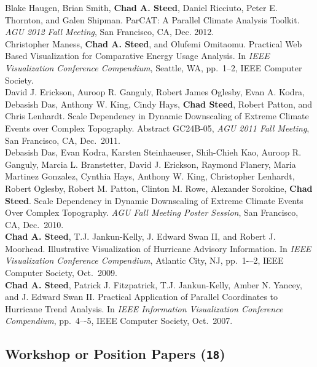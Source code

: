 \documentclass[11pt, a4paper]{article}
\newcommand{\years}[1]{\marginnote{\scriptsize #1}}
\begin{document}
\noindent\years{2012}Blake Haugen, Brian Smith, \textbf{Chad A. Steed},
Daniel Ricciuto, Peter E. Thornton, and Galen Shipman.  ParCAT: A Parallel
Climate Analysis Toolkit. \emph{AGU 2012 Fall Meeting}, San Francisco, CA, Dec. 2012.\\
\years{2012}Christopher Maness, \textbf{Chad A. Steed}, and
Olufemi Omitaomu. Practical Web Based Visualization for Comparative Energy
Usage Analysis.  In \emph{IEEE Visualization Conference Compendium}, Seattle, WA,
pp.\ 1--2, IEEE Computer Society.\\
\years{2011}David J. Erickson, Auroop R. Ganguly, Robert
James Oglesby, Evan A. Kodra, Debasish Das, Anthony W. King, Cindy Hays,
\textbf{Chad Steed}, Robert Patton, and Chris Lenhardt. Scale Dependency in
Dynamic Downscaling of Extreme Climate Events over Complex Topography.
Abstract GC24B-05, \emph{AGU 2011 Fall Meeting}, San Francisco, CA,
Dec.\ 2011.\\
\years{2010}Debasish Das, Evan Kodra, Karsten Steinhaeuser, Shih-Chieh Kao,
Auroop R. Ganguly, Marcia L. Branstetter, David J. Erickson, Raymond Flanery,
Maria Martinez Gonzalez, Cynthia Hays, Anthony W. King, Christopher Lenhardt,
Robert Oglesby, Robert M. Patton, Clinton M. Rowe, Alexander Sorokine,
\textbf{Chad Steed}.  Scale Dependency in Dynamic Downscaling of Extreme
Climate Events Over Complex Topography. \emph{AGU Fall Meeting Poster Session},
San Francisco, CA, Dec.\ 2010.\\
\years{2009}\textbf{Chad A. Steed}, T.J. Jankun-Kelly, J. Edward Swan II, and
Robert J. Moorhead. Illustrative Visualization of Hurricane Advisory
Information. In \emph{IEEE Visualization Conference Compendium}, Atlantic City, NJ,
pp.\ 1-–2, IEEE Computer Society, Oct.\ 2009.\\
\years{2007}\textbf{Chad A. Steed}, Patrick J. Fitzpatrick, T.J. Jankun-Kelly,
Amber N. Yancey, and J. Edward Swan II.  Practical Application of Parallel
Coordinates to Hurricane Trend Analysis.  In \emph{IEEE Information Visualization
Conference Compendium}, pp.\ 4–-5, IEEE Computer Society, Oct.\ 2007.

\subsection*{Workshop or Position Papers (\texttt{18})}
\end{document}

